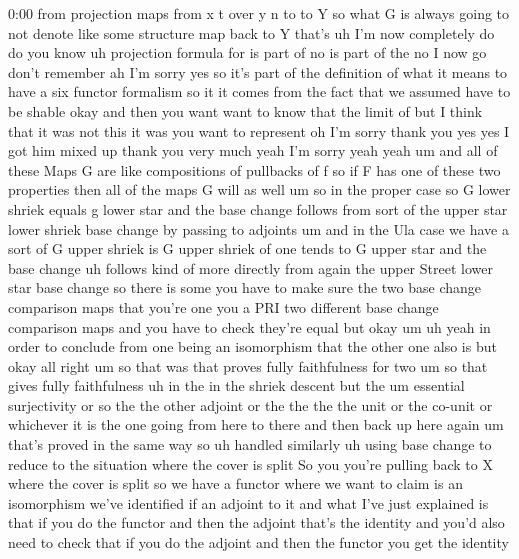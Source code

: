 \begin{unfinished}{0:00}
from  projection  maps  from  x  t  over  y  n
to  to  Y  so  what  G  is  always  going  to  not
denote  like  some  structure  map  back  to  Y
that's  uh
I'm  now
completely  do  do  you  know  uh  projection
formula  for  is  part  of  no  is  part  of  the
no  I  now  go  don't  remember  ah  I'm  sorry
yes  so  it's  part  of  the  definition  of
what  it  means  to  have  a  six  functor
formalism  so  it  it  comes  from  the  fact
that  we  assumed  have  to  be
shable  okay  and  then  you  want  want  to
know
that  the
limit  of  but  I  think  that  it  was  not
this  it
was  you  want  to  represent  oh  I'm  sorry
thank  you  yes  yes  I  got  him  mixed  up
thank  you  very  much  yeah  I'm  sorry  yeah
yeah
um  and  all  of  these  Maps  G  are  like
compositions  of  pullbacks  of  f  so  if  F
has  one  of  these  two  properties  then  all
of  the  maps  G  will  as
well
um  so  in  the  proper
case  so  G  lower  shriek  equals  g  lower
star  and  the  base
change
follows  from  sort  of  the  upper  star
lower  shriek  base
change  by  passing  to
adjoints  um  and  in  the  Ula
case  we  have  a  sort  of  G  upper  shriek  is
G  upper  shriek  of  one  tends  to  G  upper
star  and  the  base
change  uh  follows  kind  of  more  directly
from  again  the  upper  Street
lower  star  base
change  so  there  is  some  you  have  to  make
sure  the  two  base  change  comparison  maps
that
you're  one  you  a  PRI  two  different  base
change  comparison  maps  and  you  have  to
check  they're  equal  but  okay
um  uh  yeah  in  order  to  conclude  from  one
being  an  isomorphism  that  the  other  one
also  is  but
okay  all
right  um  so  that  was  that  proves  fully
faithfulness  for  two
um  so  that  gives  fully
faithfulness  uh  in  the  in  the  shriek
descent  but  the  um  essential
surjectivity  or  so  the  the  other  adjoint
or  the  the  the  the  unit  or  the  co-unit
or  whichever  it  is  the  one  going  from
here  to  there  and  then  back  up  here
again  um  that's  proved  in  the  same  way
so
uh  handled
similarly  uh  using  base
change  to  reduce  to  the  situation  where
the  cover  is  split  So  you  you're  pulling
back  to  X  where  the  cover  is
split  so  we  have  a  functor  where  we  want
to  claim  is  an  isomorphism  we've
identified  if  an  adjoint  to  it  and  what
I've  just  explained  is  that  if  you  do
the  functor  and  then  the  adjoint  that's
the  identity  and  you'd  also  need  to
check  that  if  you  do  the  adjoint  and
then  the  functor  you  get  the  identity

\end{unfinished}
